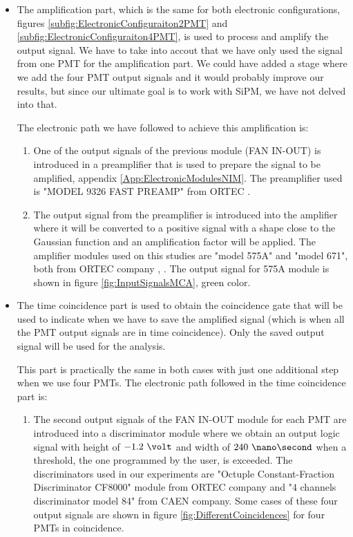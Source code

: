 \begin{itemize}

\item{} The amplification part, which is the same for both electronic configurations, figures \ref{subfig:ElectronicConfiguraiton2PMT} and \ref{subfig:ElectronicConfiguraiton4PMT}, is used to process and amplify the output signal. We have to take into accout that we have only used the signal from one PMT for the amplification part. We could have added a stage where we add the four PMT output signals and it would probably improve our results, but since our ultimate goal is to work with SiPM, we have not delved into that.

The electronic path we have followed to achieve this amplification is:

\begin{enumerate}

\item{} One of the output signals of the previous module (FAN IN-OUT) is introduced in a preamplifier that is used to prepare the signal to be amplified, appendix \ref{App:ElectronicModulesNIM}. The preamplifier used is "MODEL 9326 FAST PREAMP" from ORTEC \cite{DataSheetPreAmp}.

\item{} The output signal from the preamplifier is introduced into the amplifier where it will be converted to a positive signal with a shape close to the Gaussian function and an amplification factor will be applied. The amplifier modules used on this studies are "model 575A" and "model 671", both from ORTEC company \cite{DataSheet575Amp}, \cite{DataSheet671Amp}. The output signal for 575A module is shown in figure \ref{fig:InputSignalsMCA}, green color.

\end{enumerate}

\item{} The time coincidence part is used to obtain the coincidence gate that will be used to indicate when we have to save the amplified signal (which is when all the PMT output signals are in time coincidence). Only the saved output signal will be used for the analysis. 

This part is practically the same in both cases with just one additional step when we use four PMTs. The electronic path followed in the time coincidence part is:

\begin{enumerate}

\item{} The second output signals of the FAN IN-OUT module for each PMT are introduced into a discriminator module where we obtain an output logic signal with height of $-1.2~\volt$ and width of $240~\nano\second$ when a threshold, the one programmed by the user, is exceeded. The discriminators used in our experiments are  "Octuple Constant-Fraction Discriminator CF8000" module from ORTEC company \cite{DataSheetDiscriminator} and "4 channels discriminator model 84" from CAEN company. Some cases of these four output signals are shown in figure \ref{fig:DifferentCoincidences} for four PMTs in coincidence.


\end{enumerate}
\end{itemize}
